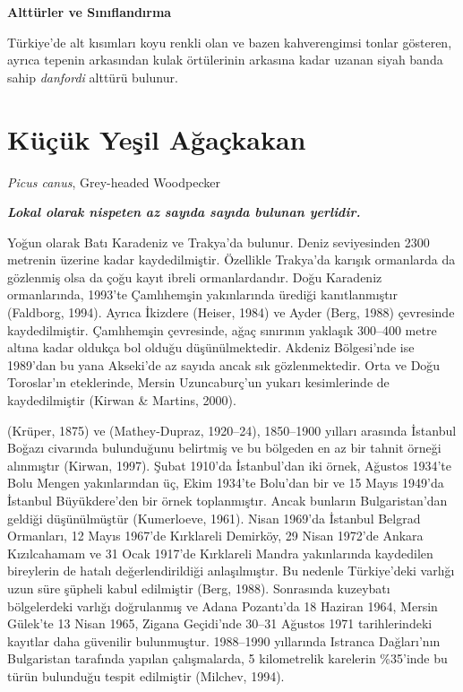 \documentclass[
  10.5pt,
  a4paper,
  DIV=11,
  numbers=noendperiod,
  twocolumn]{scrreprt}
\begin{document}
\textbf{Alttürler ve Sınıflandırma}

Türkiye'de alt kısımları koyu renkli olan ve bazen kahverengimsi tonlar
gösteren, ayrıca tepenin arkasından kulak örtülerinin arkasına kadar
uzanan siyah banda sahip \emph{danfordi} alttürü bulunur.

\section{Küçük Yeşil
Ağaçkakan}\label{kuxfcuxe7uxfck-yeux15fil-aux11fauxe7kakan}

\emph{Picus canus}, Grey-headed Woodpecker

\textbf{\emph{Lokal olarak nispeten az sayıda sayıda bulunan yerlidir.}}

Yoğun olarak Batı Karadeniz ve Trakya'da bulunur. Deniz seviyesinden
2300 metrenin üzerine kadar kaydedilmiştir. Özellikle Trakya'da karışık
ormanlarda da gözlenmiş olsa da çoğu kayıt ibreli ormanlardandır. Doğu
Karadeniz ormanlarında, 1993'te Çamlıhemşin yakınlarında ürediği
kanıtlanmıştır (Faldborg, 1994). Ayrıca İkizdere (Heiser, 1984) ve Ayder
(Berg, 1988) çevresinde kaydedilmiştir. Çamlıhemşin çevresinde, ağaç
sınırının yaklaşık 300--400 metre altına kadar oldukça bol olduğu
düşünülmektedir. Akdeniz Bölgesi'nde ise 1989'dan bu yana Akseki'de az
sayıda ancak sık gözlenmektedir. Orta ve Doğu Toroslar'ın eteklerinde,
Mersin Uzuncaburç'un yukarı kesimlerinde de kaydedilmiştir (Kirwan \&
Martins, 2000).

(Krüper, 1875) ve (Mathey-Dupraz, 1920--24), 1850--1900 yılları arasında
İstanbul Boğazı civarında bulunduğunu belirtmiş ve bu bölgeden en az bir
tahnit örneği alınmıştır (Kirwan, 1997). Şubat 1910'da İstanbul'dan iki
örnek, Ağustos 1934'te Bolu Mengen yakınlarından üç, Ekim 1934'te
Bolu'dan bir ve 15 Mayıs 1949'da İstanbul Büyükdere'den bir örnek
toplanmıştır. Ancak bunların Bulgaristan'dan geldiği düşünülmüştür
(Kumerloeve, 1961). Nisan 1969'da İstanbul Belgrad Ormanları, 12 Mayıs
1967'de Kırklareli Demirköy, 29 Nisan 1972'de Ankara Kızılcahamam ve 31
Ocak 1917'de Kırklareli Mandra yakınlarında kaydedilen bireylerin de
hatalı değerlendirildiği anlaşılmıştır. Bu nedenle Türkiye'deki varlığı
uzun süre şüpheli kabul edilmiştir (Berg, 1988). Sonrasında kuzeybatı
bölgelerdeki varlığı doğrulanmış ve Adana Pozantı'da 18 Haziran 1964,
Mersin Gülek'te 13 Nisan 1965, Zigana Geçidi'nde 30--31 Ağustos 1971
tarihlerindeki kayıtlar daha güvenilir bulunmuştur. 1988--1990
yıllarında Istranca Dağları'nın Bulgaristan tarafında yapılan
çalışmalarda, 5 kilometrelik karelerin \%35'inde bu türün bulunduğu
tespit edilmiştir (Milchev, 1994).
\end{document}
